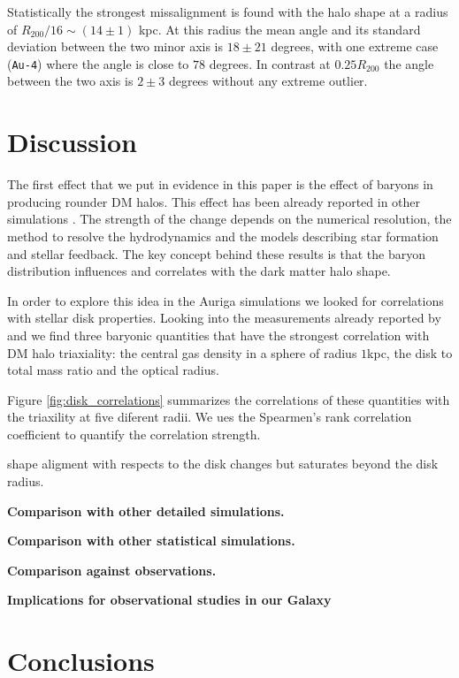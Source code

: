 \documentclass[a4paper,fleqn,usenatbib]{mnras}
\begin{document}
Statistically the strongest missalignment is found with the halo shape
at a radius of $R_{200}/16\sim (14\pm1)$ kpc. 
At this radius the mean angle and its standard deviation between the
two minor axis is $18 \pm 21$ degrees, with one extreme case
(\texttt{Au-4}) where the angle is close to $78$ degrees. 
In contrast at $0.25 R_{200}$ the angle between the two axis is
$2\pm 3$ degrees without any extreme outlier.





\section{Discussion}

The first effect that we put in evidence in this paper is the effect
of baryons in producing rounder DM halos.
This effect has been already reported in other simulations \citep{Debattista08, Bryan13,
  Butsky16, Chua19, Artale19}.
The strength of the change depends on the numerical resolution, the
method to resolve the hydrodynamics and the models describing star
formation and stellar feedback.
The key concept behind these results is that the baryon distribution
influences and correlates with the dark matter halo shape.

In order to explore this idea in the Auriga simulations we looked for
correlations with stellar disk properties. 
Looking into the measurements already reported by \cite{auriga} and
\cite{pakmor17} we find three baryonic quantities that have the
strongest correlation with DM halo triaxiality: the central gas
density in a sphere of radius $1$kpc, the disk to total mass ratio and
the optical radius.


Figure \ref{fig:disk_correlations} summarizes the correlations of
these quantities with the triaxility at five diferent radii.
We ues the Spearmen's rank correlation coefficient to quantify the
correlation strength.




\citep{Debatistta08} shape aligment with respects to the disk changes
but saturates beyond the disk radius.


{\bf Comparison with other detailed simulations.}

{\bf Comparison with other statistical simulations.}

{\bf Comparison against observations.}

{\bf Implications for observational studies in our Galaxy}

\section{Conclusions}
\end{document}
